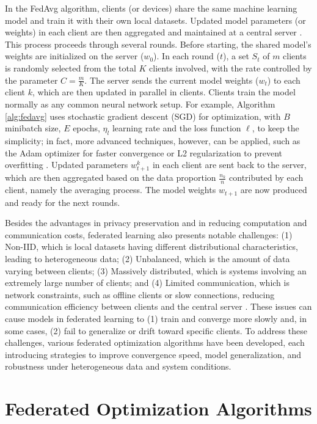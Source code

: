 In the FedAvg algorithm, clients (or devices) share the same machine learning model and train it with their own local datasets. Updated model parameters (or weights) in each client are then aggregated and maintained at a central server \citep{mcmahan2023communication}. This process proceeds through several rounds. Before starting, the shared model's weights are initialized on the server ($w_0$). In each round ($t$), a set $S_t$ of $m$ clients is randomly selected from the total $K$ clients involved, with the rate controlled by the parameter $C = \frac{m}{K}$. The server sends the current model weights ($w_t$) to each client $k$, which are then updated in parallel in clients. Clients train the model normally as any common neural network setup. For example, Algorithm \ref{alg:fedavg} uses stochastic gradient descent (SGD) for optimization, with $B$ minibatch size, $E$ epochs,  $\eta_l$ learning rate and the loss function $\ell$, to keep the simplicity; in fact, more advanced techniques, however, can be applied, such as the Adam optimizer for faster convergence or L2 regularization to prevent overfitting \citep{mcmahan2023communication}. Updated parameters $w^{k}_{t+1}$ in each client are sent back to the server, which are then aggregated based on the data proportion $\frac{n_k}{n}$ contributed by each client, namely the averaging process. The model weights $w_{t+1}$ are now produced and ready for the next rounds.

Besides the advantages in privacy preservation and in reducing computation and communication costs, federated learning also presents notable challenges: (1) Non-IID, which is local datasets having different distributional characteristics, leading to heterogeneous data; (2) Unbalanced, which is the amount of data varying between clients; (3) Massively distributed, which is systems involving an extremely large number of clients; and (4) Limited communication, which is network constraints, such as offline clients or slow connections, reducing communication efficiency between clients and the central server \citep{mcmahan2023communication}. These issues can cause models in federated learning to (1) train and converge more slowly and, in some cases, (2) fail to generalize or drift toward specific clients. To address these challenges, various federated optimization algorithms have been developed, each introducing strategies to improve convergence speed, model generalization, and robustness under heterogeneous data and system conditions. 

\section{Federated Optimization Algorithms}

